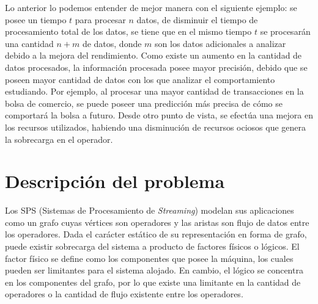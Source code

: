 Lo anterior lo podemos entender de mejor manera con el siguiente ejemplo: se posee un tiempo $t$ para procesar $n$ datos, de disminuir el tiempo de procesamiento total de los datos, se tiene que en el mismo tiempo $t$ se procesarán una cantidad $n+m$ de datos, donde $m$ son los datos adicionales a analizar debido a la mejora del rendimiento. Como existe un aumento en la cantidad de datos procesados, la información procesada posee mayor precisión, debido que se poseen mayor cantidad de datos con los que analizar el comportamiento estudiando. Por ejemplo, al procesar una mayor cantidad de transacciones en la bolsa de comercio, se puede poseer una predicción más precisa de cómo se comportará la bolsa a futuro. Desde otro punto de vista, se efectúa una mejora en los recursos utilizados, habiendo una disminución de recursos ociosos que genera la sobrecarga en el operador.

\section{Descripción del problema}
\label{intro:problema}


Los SPS (Sistemas de Procesamiento de \textit{Streaming}) modelan sus aplicaciones como un grafo cuyas vértices son operadores y las aristas son flujo de datos entre los operadores. Dada el carácter estático de su representación en forma de grafo, puede existir sobrecarga del sistema a producto de factores físicos o lógicos. El factor físico se define como los componentes que posee la máquina, los cuales pueden ser limitantes para el sistema alojado. En cambio, el lógico se concentra en los componentes del grafo, por lo que existe una limitante en la cantidad de operadores o la cantidad de flujo existente entre los operadores.


